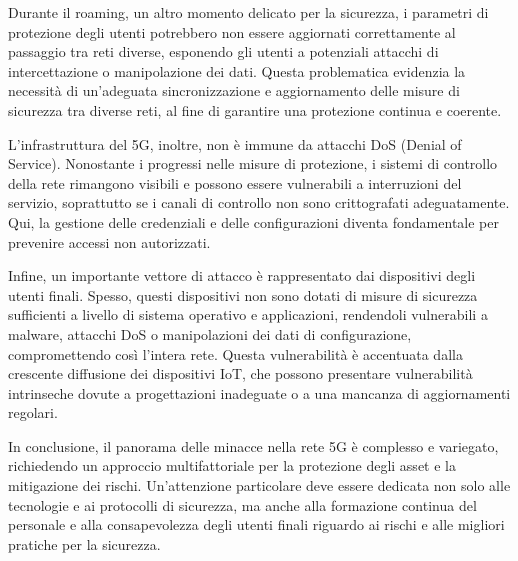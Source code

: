\documentclass[english]{article}
\begin{document}
Durante il roaming, un altro momento delicato per la sicurezza, i parametri di
protezione degli utenti potrebbero non essere aggiornati correttamente al
passaggio tra reti diverse, esponendo gli utenti a potenziali attacchi di
intercettazione o manipolazione dei dati. Questa problematica evidenzia la
necessità di un'adeguata sincronizzazione e aggiornamento delle misure di
sicurezza tra diverse reti, al fine di garantire una protezione continua e
coerente.

L'infrastruttura del 5G, inoltre, non è immune da attacchi DoS (Denial of
Service). Nonostante i progressi nelle misure di protezione, i sistemi di
controllo della rete rimangono visibili e possono essere vulnerabili a
interruzioni del servizio, soprattutto se i canali di controllo non sono
crittografati adeguatamente. Qui, la gestione delle credenziali e delle
configurazioni diventa fondamentale per prevenire accessi non autorizzati.

Infine, un importante vettore di attacco è rappresentato dai dispositivi degli
utenti finali. Spesso, questi dispositivi non sono dotati di misure di
sicurezza sufficienti a livello di sistema operativo e applicazioni, rendendoli
vulnerabili a malware, attacchi DoS o manipolazioni dei dati di configurazione,
compromettendo così l'intera rete. Questa vulnerabilità è accentuata dalla
crescente diffusione dei dispositivi IoT, che possono presentare vulnerabilità
intrinseche dovute a progettazioni inadeguate o a una mancanza di aggiornamenti
regolari.

In conclusione, il panorama delle minacce nella rete 5G è complesso e
variegato, richiedendo un approccio multifattoriale per la protezione degli
asset e la mitigazione dei rischi. Un'attenzione particolare deve essere
dedicata non solo alle tecnologie e ai protocolli di sicurezza, ma anche alla
formazione continua del personale e alla consapevolezza degli utenti finali
riguardo ai rischi e alle migliori pratiche per la sicurezza.
\end{document}
